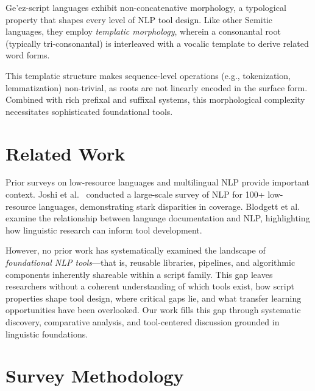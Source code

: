 \documentclass[12pt,a4paper]{article}
\theoremstyle{plain}
\theoremstyle{definition}
\begin{document}
Ge'ez-script languages exhibit non-concatenative morphology, a typological property that shapes every level of NLP tool design. Like other Semitic languages, they employ \emph{templatic morphology}, wherein a consonantal root (typically tri-consonantal) is interleaved with a vocalic template to derive related word forms.

This templatic structure makes sequence-level operations (e.g., tokenization, lemmatization) non-trivial, as roots are not linearly encoded in the surface form. Combined with rich prefixal and suffixal systems, this morphological complexity necessitates sophisticated foundational tools.


\section{Related Work}
\label{sec:related}

Prior surveys on low-resource languages and multilingual NLP provide important context. Joshi et al.~\cite{joshi_state_2020} conducted a large-scale survey of NLP for 100+ low-resource languages, demonstrating stark disparities in coverage. Blodgett et al.~\cite{blodgett_language_2021} examine the relationship between language documentation and NLP, highlighting how linguistic research can inform tool development.

However, no prior work has systematically examined the landscape of \emph{foundational NLP tools}---that is, reusable libraries, pipelines, and algorithmic components inherently shareable within a script family. This gap leaves researchers without a coherent understanding of which tools exist, how script properties shape tool design, where critical gaps lie, and what transfer learning opportunities have been overlooked. Our work fills this gap through systematic discovery, comparative analysis, and tool-centered discussion grounded in linguistic foundations.


\section{Survey Methodology}
\label{sec:methodology}
\end{document}
